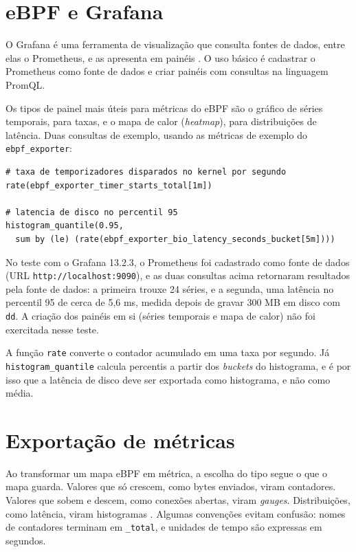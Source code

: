 \section{eBPF e Grafana}

O Grafana é uma ferramenta de visualização que consulta fontes de dados, entre elas o Prometheus, e as apresenta em painéis \cite{grafanadocs}. O uso básico é cadastrar o Prometheus como fonte de dados e criar painéis com consultas na linguagem PromQL.

Os tipos de painel mais úteis para métricas do eBPF são o gráfico de séries temporais, para taxas, e o mapa de calor (\textit{heatmap}), para distribuições de latência. Duas consultas de exemplo, usando as métricas de exemplo do \texttt{ebpf\_exporter}:

\begin{lstlisting}
# taxa de temporizadores disparados no kernel por segundo
rate(ebpf_exporter_timer_starts_total[1m])

# latencia de disco no percentil 95
histogram_quantile(0.95,
  sum by (le) (rate(ebpf_exporter_bio_latency_seconds_bucket[5m])))
\end{lstlisting}

No teste com o Grafana 13.2.3, o Prometheus foi cadastrado como fonte de dados (URL \texttt{http://localhost:9090}), e as duas consultas acima retornaram resultados pela fonte de dados: a primeira trouxe 24 séries, e a segunda, uma latência no percentil 95 de cerca de 5,6 ms, medida depois de gravar 300 MB em disco com \texttt{dd}. A criação dos painéis em si (séries temporais e mapa de calor) não foi exercitada nesse teste.

A função \texttt{rate} converte o contador acumulado em uma taxa por segundo. Já \texttt{histogram\_\allowbreak quantile} calcula percentis a partir dos \textit{buckets} do histograma, e é por isso que a latência de disco deve ser exportada como histograma, e não como média.

\section{Exportação de métricas}\label{sec:exportacao}

Ao transformar um mapa eBPF em métrica, a escolha do tipo segue o que o mapa guarda. Valores que só crescem, como bytes enviados, viram contadores. Valores que sobem e descem, como conexões abertas, viram \textit{gauges}. Distribuições, como latência, viram histogramas \cite{turnbull2018}. Algumas convenções evitam confusão: nomes de contadores terminam em \texttt{\_total}, e unidades de tempo são expressas em segundos.

